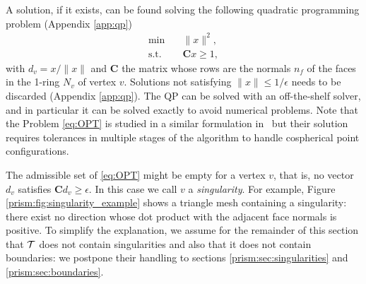A solution, if it exists, can be found solving the following quadratic programming problem (Appendix \ref{app:qp})
\begin{equation}
\label{eq:QP}
\begin{split}
    \min&\quad \|x\|^2,  \\
    \text{s.t.}&\quad \mathbf{C} x \geq 1,
\end{split}
\end{equation}
with $d_v = x / \|x\|$ and $\mathbf{C}$ the matrix whose rows are the normals $n_f$ of the faces in the 1-ring $N_v$ of vertex $v$. Solutions not satisfying $\|x\| \leq 1/\epsilon$ needs to be discarded (Appendix \ref{app:qp}). The QP can be solved with an off-the-shelf solver\cite{osqp,cheshmi2020nasoq}, and in particular it can be solved exactly \cite{gartner2000efficient} to avoid numerical problems. Note that the Problem \eqref{eq:OPT} is studied in a similar formulation in~\cite{aubry2008most} but their solution requires tolerances in multiple stages of the algorithm to handle cospherical point configurations.

The admissible set of \eqref{eq:OPT} might be empty for a vertex $v$,
that is, no vector $d_v$ satisfies $\mathbf{C}d_v\geq\epsilon$. 
In this case we call $v$ a \emph{singularity}. For example, Figure \ref{prism:fig:singularity_example} shows a triangle mesh containing a singularity: there exist no direction whose dot product with the adjacent face normals is positive. To simplify the explanation, we assume for the remainder of this section that $\mathcal{T}$ does not contain singularities and also that it does not contain boundaries: we postpone their handling to sections \ref{prism:sec:singularities} and \ref{prism:sec:boundaries}.

